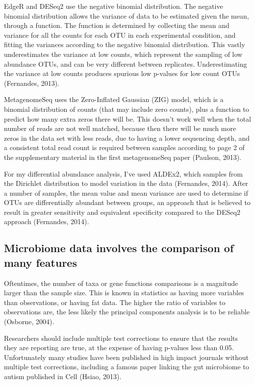 EdgeR and DESeq2 use the negative binomial distribution. The negative binomial distribution allows the variance of data to be estimated given the mean, through a function. The function is determined by collecting the mean and variance for all the counts for each OTU in each experimental condition, and fitting the variances according to the negative binomial distribution. This vastly underestimates the variance at low counts, which represent the sampling of low abundance OTUs, and can be very different between replicates. Underestimating the variance at low counts produces spurious low p-values for low count OTUs (Fernandes, 2013).

MetagenomeSeq uses the Zero-Inflated Gaussian (ZIG) model, which is a binomial distribution of counts (that may include zero counts), plus a function to predict how many extra zeros there will be. This doesn’t work well when the total number of reads are not well matched, because then there will be much more zeros in the data set with less reads, due to having a lower sequencing depth, and a consistent total read count is required between samples according to page 2 of the supplementary material in the first metagenomeSeq paper (Paulson, 2013).

For my differential abundance analysis, I’ve used ALDEx2, which samples from the Dirichlet distribution to model variation in the data (Fernandes, 2014). After a number of samples, the mean value and mean variance are used to determine if OTUs are differentially abundant between groups, an approach that is believed to result in greater sensitivity and equivalent specificity compared to the DESeq2 approach (Fernandes, 2014).

\subsection{Microbiome data involves the comparison of many features}
Oftentimes, the number of taxa or gene functions comparisons is a magnitude larger than the sample size. This is known in statistics as having more variables than observations, or having fat data. The higher the ratio of variables to observations are, the less likely the principal components analysis is to be reliable (Osborne, 2004).

Researchers should include multiple test corrections to ensure that the results they are reporting are true, at the expense of having p-values less than 0.05. Unfortunately many studies have been published in high impact journals without multiple test corrections, including a famous paper linking the gut microbiome to autism published in Cell (Hsiao, 2013).

